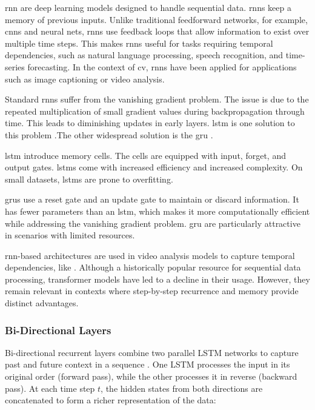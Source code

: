 \acrfull{rnn} are deep learning models designed to handle sequential data. \acrshort{rnn}s keep a memory of previous inputs. Unlike traditional feedforward networks, for example, \acrshort{cnn}s and neural nets, \acrshort{rnn}s use feedback loops that allow information to exist over multiple time steps.  This makes \acrshort{rnn}s useful for tasks requiring temporal dependencies, such as natural language processing, speech recognition, and time-series forecasting\cite{ibm_rnn_2025}. In the context of \acrfull{cv}, \acrshort{rnn}s have been applied for applications such as image captioning or video analysis. 

Standard \acrshort{rnn}s suffer from the vanishing gradient problem. The issue is due to the repeated multiplication of small gradient values during backpropagation through time. This leads to diminishing updates in early layers. \acrfull{lstm} is one solution to this problem \cite{bhogal_human_2023, kumar_human_2023, mahaseni_spotting_2021}.The other widespread solution is the \acrfull{gru} \cite{giveki_human_2024,li_oarnet_2024,yu_i3d_2023}. 

\acrlong{lstm} introduce memory cells. The cells are equipped with input, forget, and output gates. \acrshort{lstm}s come with increased efficiency and increased complexity. On small datasets, \acrshort{lstm}s are prone to overfitting. 

\acrlong{gru}s use a reset gate and an update gate to maintain or discard information. It has fewer parameters than an \acrshort{lstm}, which makes it more computationally efficient while addressing the vanishing gradient problem. \acrshort{gru} are particularly attractive in scenarios with limited resources. 

\acrshort{rnn}-based architectures are used in video analysis models to capture temporal dependencies, like \textcite{bhogal_human_2023}. Although a historically popular resource for sequential data processing, transformer models have led to a decline in their usage. However, they remain relevant in contexts where step-by-step recurrence and memory provide distinct advantages\cite{ibm_rnn_2025}.

\subsubsection{Bi-Directional Layers}
\label{ssec:bi_directional_layers}

Bi-directional recurrent layers combine two parallel LSTM networks to capture past and future context in a sequence \cite{radhakrishnan_bi_lstm_2023, bhogal_human_2023}. One LSTM processes the input in its original order (forward pass), while the other processes it in reverse (backward pass). At each time step \(t\), the hidden states from both directions are concatenated to form a richer representation of the data:

